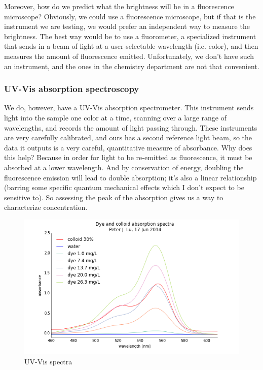 Moreover, how do we predict what the brightness will be in a fluorescence
microscope? Obviously, we could use a fluorescence microscope, but if that is
the instrument we are testing, we would prefer an independent way to measure the
brightness. The best way would be to use a fluorometer, a specialized instrument
that sends in a beam of light at a user-selectable wavelength (i.e. color), and
then measures the amount of fluorescence emitted. Unfortunately, we don't have
such an instrument, and the ones in the chemistry department are not that
convenient.

\subsubsection{UV-Vis absorption
spectroscopy}\label{uv-vis-absorption-spectroscopy} We do, however, have a UV-Vis absorption spectrometer. This instrument sends
light into the sample one color at a time, scanning over a large range of
wavelengths, and records the amount of light passing through. These instruments
are very carefully calibrated, and ours has a second reference light beam, so
the data it outputs is a very careful, quantitative measure of absorbance. Why
does this help? Because in order for light to be re-emitted as fluorescence, it
must be absorbed at a lower wavelength. And by conservation of energy, doubling
the fluorescence emission will lead to double absorption; it's also a linear
relationship (barring some specific quantum mechanical effects which I don't
expect to be sensitive to). So assessing the peak of the absorption gives us a
way to characterize concentration.
\begin{figure}[h]
\begin{center}
\includegraphics[width=\columnwidth]{./images/2014_06_17_dye/dye_colloid_abs_140617.png}
\end{center}
\caption{UV-Vis spectra}
\end{figure}

